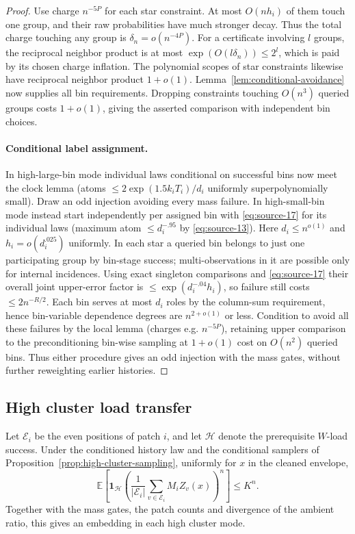\begin{proof}
Use charge \(n^{-5P}\) for each star constraint. At most \(O(nh_i)\) of them touch one group, and their raw probabilities have much stronger decay. Thus the total charge touching any group is \(\delta_n=o(n^{-4P})\). For a certificate involving \(l\) groups, the reciprocal neighbor product is at most \(\exp(O(l\delta_n))\le2^l\), which is paid by its chosen charge inflation. The polynomial scopes of star constraints likewise have reciprocal neighbor product \(1+o(1)\). Lemma~\ref{lem:conditional-avoidance} now supplies all bin requirements. Dropping constraints touching \(O(n^3)\) queried groups costs \(1+o(1)\), giving the asserted comparison with independent bin choices.

\paragraph{Conditional label assignment.}
In high-large-bin mode individual laws conditional on successful bins now meet the clock lemma (atoms \(\le2\exp(1.5k_iT_i)/d_i\) uniformly superpolynomially small). Draw an odd injection avoiding every mass failure. In high-small-bin mode instead start independently per assigned bin with \eqref{eq:source-17} for its individual laws (maximum atom \(\le d_i^{-.95}\) by \eqref{eq:source-13}). Here \(d_i\le n^{o(1)}\) and \(h_i=o(d_i^{.025})\) uniformly. In each star a queried bin belongs to just one participating group by bin-stage success; multi-observations in it are possible only for internal incidences. Using exact singleton comparisons and \eqref{eq:source-17} their overall joint upper-error factor is \(\le\exp(d_i^{-.04}h_i)\), so failure still costs \(\le2n^{-R/2}\). Each bin serves at most \(d_i\) roles by the column-sum requirement, hence bin-variable dependence degrees are \(n^{2+o(1)}\) or less. Condition to avoid all these failures by the local lemma (charges e.g. \(n^{-5P}\)), retaining upper comparison to the preconditioning bin-wise sampling at \(1+o(1)\) cost on \(O(n^2)\) queried bins. Thus either procedure gives an odd injection with the mass gates, without further reweighting earlier histories.
\end{proof}

\subsection{High cluster load transfer}
\label{sec:high-cluster-load-transfer}

\begin{proposition}\label{prop:high-cluster-loads}
Let \(\mathcal E_i\) be the even positions of patch \(i\), and let \(\mathcal H\) denote the prerequisite \(W\)-load success. Under the conditioned history law and the conditional samplers of Proposition~\ref{prop:high-cluster-sampling}, uniformly for \(x\) in the cleaned envelope,
\[
 \mathbb E\!\left[\mathbf1_{\mathcal H}
 \left(\frac{1}{|\mathcal E_i|}\sum_{v\in\mathcal E_i}M_iZ_v(x)\right)^n\right]
 \le K^n .
\]
Together with the mass gates, the patch counts and divergence of the ambient ratio, this gives an embedding in each high cluster mode.
\end{proposition}

